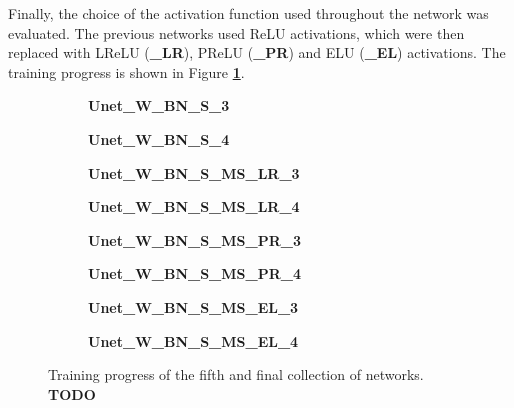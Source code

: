 Finally, the choice of the activation function used throughout the network was evaluated. The previous networks used ReLU activations, which were then replaced with LReLU (\textbf{\_LR}), PReLU (\textbf{\_PR}) and ELU (\textbf{\_EL}) activations. The training progress is shown in Figure \textbf{\ref{fig:weighted_batchnorm_shuffle_msra_acts_training}}.\\

\begin {figure}[!ht]
	\begin {subfigure}[b]{0.4\linewidth}
		\caption{\textbf{Unet\_W\_BN\_S\_3}}
	\end {subfigure}\hspace{1.75cm}
	\begin {subfigure}[b]{0.4\linewidth}
		\caption{\textbf{Unet\_W\_BN\_S\_4}}
	\end {subfigure}

	\begin {subfigure}[b]{0.4\linewidth}
		\caption{\textbf{Unet\_W\_BN\_S\_MS\_LR\_3}}
	\end {subfigure}\hspace{1.75cm}
	\begin {subfigure}[b]{0.4\linewidth}
		\caption{\textbf{Unet\_W\_BN\_S\_MS\_LR\_4}}
	\end {subfigure}

	\begin {subfigure}[b]{0.4\linewidth}
		\caption{\textbf{Unet\_W\_BN\_S\_MS\_PR\_3}}
	\end {subfigure}\hspace{1.75cm}
	\begin {subfigure}[b]{0.4\linewidth}
		\caption{\textbf{Unet\_W\_BN\_S\_MS\_PR\_4}}
	\end {subfigure}

	\begin {subfigure}[b]{0.4\linewidth}
		\caption{\textbf{Unet\_W\_BN\_S\_MS\_EL\_3}}
	\end {subfigure}\hspace{1.75cm}
	\begin {subfigure}[b]{0.4\linewidth}
		\caption{\textbf{Unet\_W\_BN\_S\_MS\_EL\_4}}
	\end {subfigure}

		\caption[Training progress of the fifth collection of networks.]{Training progress of the fifth and final collection of networks. \textbf{TODO}}
		\label{fig:weighted_batchnorm_shuffle_msra_acts_training}
\end {figure}

